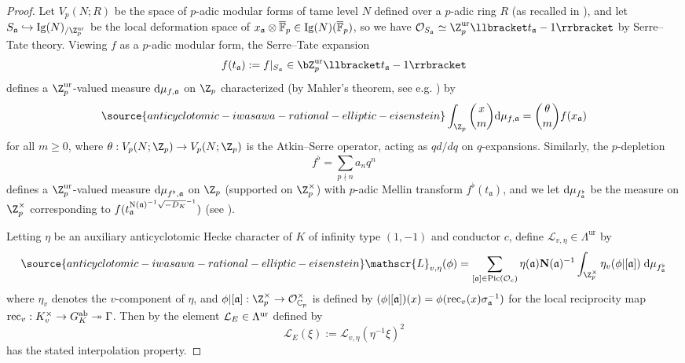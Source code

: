\begin{proof}
Let $V_p(N;R)$ be the space of $p$-adic modular forms of tame level $N$ defined over a $p$-adic ring $R$ (as recalled in \cite[\S{2.2}]{cas-hsieh1}), and let $S_{\mathfrak{a}}\hookrightarrow{\rm Ig}(N)_{/\Z_p^{\rm ur}}$ be the local deformation space of $x_\mathfrak{a}\otimes\overline{\mathbb{F}}_p\in{\rm Ig}(N)(\overline{\mathbb{F}}_p)$, so we have $\mathcal{O}_{S_{\mathfrak{a}}}\simeq\Z_p^{\rm ur}\llbracket t_\mathfrak{a}-1\rrbracket$ by Serre--Tate theory. Viewing $f$ as a $p$-adic modular form, the Serre--Tate expansion
\[
f(t_{\mathfrak{a}}):=f\vert_{S_\mathfrak{a}}\in\bZ_p^{\rm ur}\llbracket t_{\mathfrak{a}}-1\rrbracket
\]
defines a $\Z_p^{\rm ur}$-valued measure ${\rm d}\mu_{f,\mathfrak{a}}$ on $\Z_p$ characterized (by Mahler's theorem, see e.g. \cite[\S{3.3}, Thm.~1]{hida-blue}) by
\begin{equation}\label{eq:def-meas}
\source{anticyclotomic-iwasawa-rational-elliptic-eisenstein}
\int_{\Z_p}\binom{x}{m}{\rm d}\mu_{f,{\mathfrak{a}}}=\binom{\theta}{m}f(x_{\mathfrak{a}})
\end{equation}
for all $m\geqslant 0$, %
where $\theta:V_p(N;\Z_p)\rightarrow V_p(N;\Z_p)$ is the Atkin--Serre operator, acting as $qd/dq$ on $q$-expansions. Similarly, the $p$-depletion
\[
f^\flat=\sum_{p\nmid n}a_nq^n
\]
defines a $\Z_p^{\rm ur}$-valued measure ${\rm d}\mu_{f^\flat,\mathfrak{a}}$  on $\Z_p$ (supported on $\Z_p^\times$) with $p$-adic Mellin transform $f^\flat(t_\mathfrak{a})$, and we let ${\rm d}\mu_{f^\flat_{\mathfrak{a}}}$ be the measure on $\Z_p^\times$ corresponding to $f(t_{\mathfrak{a}}^{{\rm N}(\mathfrak{a})^{-1}\sqrt{-D_K}^{-1}})$ (see \cite[Prop.~3.3]{cas-hsieh1}).

Letting $\eta$ be an auxiliary anticyclotomic Hecke character of $K$ of infinity type $(1,-1)$ and conductor $c$, define $\mathscr{L}_{v,\eta}\in\Lambda^{\mathrm{ur}}$ by
\begin{equation}\label{eq:cusp-measure}
\source{anticyclotomic-iwasawa-rational-elliptic-eisenstein}
\mathscr{L}_{v,\eta}(\phi)=
\sum_{[\mathfrak{a}]\in\mathrm{Pic}(\mathcal{O}_c)}
\eta(\mathfrak{a})\mathbf{N}(\mathfrak{a})^{-1}
\int_{\Z_p^\times}\eta_v(\phi\vert[\mathfrak{a}])\;\mathrm{d}\mu_{f^\flat_\mathfrak{a}}
\end{equation}
where $\eta_v$ denotes the $v$-component of $\eta$, and $\phi\vert[\mathfrak{a}]:\Z_p^\times\rightarrow\mathcal{O}_{\mathbb{C}_p}^\times$ is defined by $(\phi\vert[\mathfrak{a}])(x)=\phi({\rm rec}_v(x)\sigma_{\mathfrak{a}}^{-1})$ for the local reciprocity map ${\rm rec}_v:K_v^\times\rightarrow G_K^{\rm ab}\twoheadrightarrow\Gamma$. Then by \cite[Prop.~3.8]{cas-hsieh1} the element $\mathcal{L}_E\in\Lambda^{\rm ur}$
defined by
\[
\mathcal{L}_E(\xi):=\mathscr{L}_{v,\eta}(\eta^{-1}\xi)^2
\]
has the stated interpolation property.
\end{proof}


